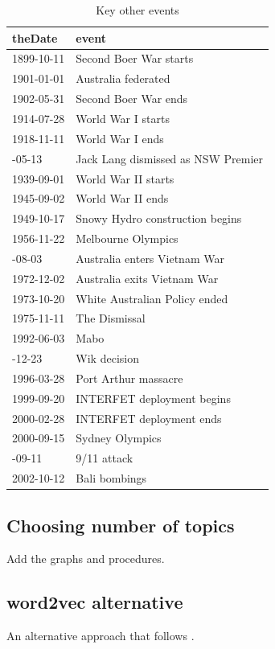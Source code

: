 \documentclass[12pt,]{article}
\theoremstyle{definition}
\theoremstyle{definition}
\theoremstyle{definition}
\theoremstyle{remark}
\begin{document}
\begin{table}

\caption{\label{tab:otherevents}Key other events}
\centering
\fontsize{8}{10}\selectfont
\begin{tabular}[t]{ll}
\toprule
theDate & event\\
\midrule
1899-10-11 & Second Boer War starts\\
1901-01-01 & Australia federated\\
1902-05-31 & Second Boer War ends\\
1914-07-28 & World War I starts\\
1918-11-11 & World War I ends\\
\addlinespace
1932-05-13 & Jack Lang dismissed as NSW Premier\\
1939-09-01 & World War II starts\\
1945-09-02 & World War II ends\\
1949-10-17 & Snowy Hydro construction begins\\
1956-11-22 & Melbourne Olympics\\
\addlinespace
1962-08-03 & Australia enters Vietnam War\\
1972-12-02 & Australia exits Vietnam War\\
1973-10-20 & White Australian Policy ended\\
1975-11-11 & The Dismissal\\
1992-06-03 & Mabo\\
\addlinespace
1996-12-23 & Wik decision\\
1996-03-28 & Port Arthur massacre\\
1999-09-20 & INTERFET deployment begins\\
2000-02-28 & INTERFET deployment ends\\
2000-09-15 & Sydney Olympics\\
\addlinespace
2001-09-11 & 9/11 attack\\
2002-10-12 & Bali bombings\\
\bottomrule
\end{tabular}
\end{table}

\subsection{Choosing number of topics}\label{choosing-number-of-topics}

Add the graphs and procedures.

\subsection{word2vec alternative}\label{word2vec-alternative}

An alternative approach that follows \citet{Taddy2015}.

\newpage




\newpage
\singlespacing 
\renewcommand\refname{References}

\end{document}
